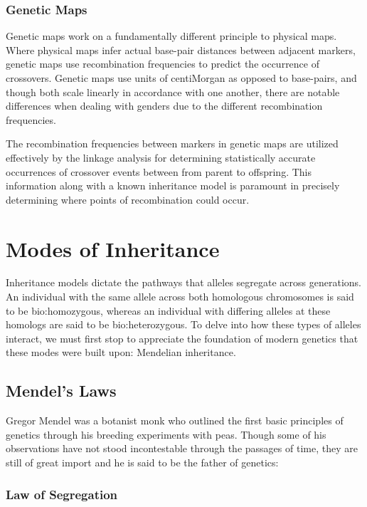 \subsubsection{Genetic Maps}

Genetic maps work on a fundamentally different principle to physical maps. Where physical maps infer actual base-pair distances between adjacent markers, genetic maps use recombination frequencies to predict the occurrence of crossovers. Genetic maps use units of centiMorgan as opposed to base-pairs, and though both scale linearly in accordance with one another, there are notable differences when dealing with genders due to the different recombination frequencies. 

The recombination frequencies between markers in genetic maps are utilized effectively by the linkage analysis for determining statistically accurate occurrences of crossover events between from parent to offspring. This information along with a known inheritance model is paramount in precisely determining where points of recombination could occur.


\section{Modes of Inheritance}

Inheritance models dictate the pathways that alleles segregate across generations.  An individual with the same allele across both homologous chromosomes is said to be \gls{bio:homozygous}, whereas an individual with differing alleles at these homologs are said to be \gls{bio:heterozygous}. To delve into how these types of alleles interact, we must first stop to appreciate the foundation of modern genetics that these modes were built upon: Mendelian inheritance.

\subsection{Mendel's Laws}

Gregor Mendel was a botanist monk who outlined the first basic principles of genetics through his breeding experiments with peas. Though some of his observations have not stood incontestable through the passages of time, they are still of great import and he is said to be the father of genetics:

\subsubsection{Law of Segregation}

